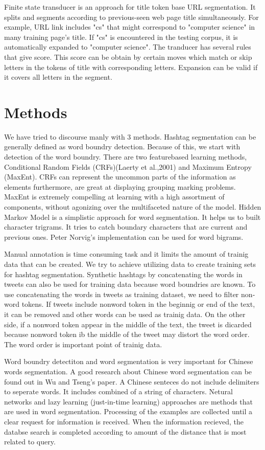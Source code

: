 \documentclass[12pt]{comjnl}
\begin{document}
Finite state transducer is an approach for title token base URL segmentation. It splits and segments according to previous-seen web page title simultaneously. For example, URL link includes "cs" that might correspond to "computer science" in many training page's title. If "cs" is encountered in the testing corpus, it is automatically expanded to "computer science". The tranducer has several rules that give score. This score can be obtain by certain moves which match or skip letters in the tokens of title with corresponding letters. Expansion can be valid if it covers all letters in the segment.

\section{Methods}
We have tried to discourse manly with 3 methods. Hashtag segmentation can be generally defined as word boundry detection. Because of this, we
start with detection of the word boundry. There are two feature­based learning methods,
Conditional Random Fields (CRFs)(Laerty et al.,2001) and Maximum Entropy (MaxEnt).
CRFs can represent the uncommon parts of the information as elements furthermore, are great at
displaying grouping marking problems. MaxEnt is extremely compelling at learning with a high
assortment of components, without agonizing over the multifaceted nature of the model. Hidden
Markov Model is a simplistic approach for word segmentation. It helps us to built character
trigrams. It tries to catch boundary characters that are current and previous ones. Peter Norvig's
implementation can be used for word bigrams.

Manual annotation is time consuming task and it limits the amount of trainig data that can be
created. We try to achieve utilizing data to create training sets for hashtag segmentation. Synthetic
hashtags by concatenating the words in tweets can also be used for training data because word
boundries are known. To use concatenating the words in tweets as training dataset, we need to filter
non­word tokens. If tweets include non­word token in the beginnig or end of the text, it can be
removed and other words can be used as trainig data. On the other side, if a non­word token appear
in the middle of the text, the tweet is dicarded because non­word token ib the middle of the tweet
may distort the word order. The word order is important point of trainig data.

Word boundry detectiton and word segmentation is very important for Chinese words segmentation. A good research about Chinese word segmentation can be found out in Wu and Tseng's paper. A Chinese senteces do not
include delimiters to seperate words. It includes combined of a string of characters. Netural
networks and lazy learning (just-in-time learning) approaches are methods that are used in word segmentation.
Processing of the examples are collected until a clear request for information is received. When the information recieved, the databse search is completed according to amount of the distance that is most related to query.
\end{document}
